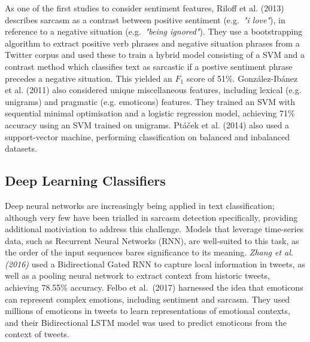 \documentclass[12pt,a4paper]{article}
\begin{document}

As one of the first studies to consider sentiment features, Riloff et al. (2013) \cite{riloff2013sarcasm} describes sarcasm as a contrast between positive sentiment (e.g.\ \textit{"i love"}), in reference to a negative situation (e.g.\ \textit{"being ignored"}). They use a bootstrapping algorithm to extract positive verb phrases and negative situation phrases from a Twitter corpus and used these to train a hybrid model consisting of a SVM and a contrast method which classifies text as sarcastic if a postive sentiment phrase precedes a negative situation. This yielded an $F_1$ score of 51\%. Gonz{\'a}lez-Ib{\'a}nez et al. (2011) \cite{gonzalez2011identifying} also considered unique miscellaneous features, including lexical (e.g. unigrams) and pragmatic (e.g. emoticons) features. They trained an SVM with sequential minimal optimisation and a logistic regression model, achieving 71\% accuracy using an SVM trained on unigrams. Pt{\'a}{\v{c}ek et al. (2014)} \cite{ptavcek2014sarcasm} also used a support-vector machine, performing classification on balanced and inbalanced datasets.


\subsection{Deep Learning Classifiers}\vspace{-10pt}
\noindent Deep neural networks are increasingly being applied in text classification; although very few have been trialled in sarcasm detection specifically, providing additional motiviation to address this challenge.\ Models that leverage time-series data, such as Recurrent Neural Networks (RNN), are well-suited to this task, as the order of the input sequences bares significance to its meaning. \textit{Zhang et al. (2016)} \cite{zhang2016tweet} used a Bidirectional Gated RNN to capture local information in tweets, as well as a pooling neural network to extract context from historic tweets, achieving 78.55\% accuracy. Felbo et al.\ (2017)\cite{felbo2017using} harnessed the idea that emoticons can represent complex emotions, including sentiment and sarcasm. They used millions of emoticons in tweets to learn representations of emotional contexts, and their Bidirectional LSTM model was used to predict emoticons from the context of tweets.
\end{document}
